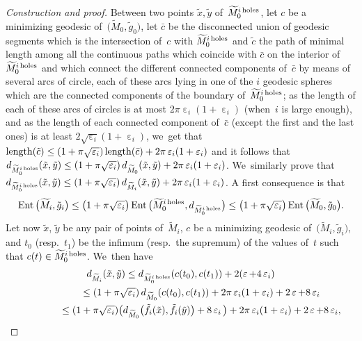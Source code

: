 \documentclass[pdftex]{sigma}
\numberwithin{equation}{section}
\newcommand{\Ent}{\operatorname{Ent}}
\newcommand{\e}{\operatorname{\varepsilon}}
\begin{document}
\begin{proof}[Construction and proof]
Between two points $\tilde x, \tilde y$ of~$\widetilde M_0^{i {\rm \, holes}}$, let $c$ be a minimizing geodesic of~$\big(\widetilde M_0, \tilde g_0\big)$, let $\bar c$ be
the disconnected union of geodesic segments which is the intersection of~$c$ with $\widetilde M_0^{i {\rm \, holes}}$ and $\tilde c$ the path of minimal length
among all the continuous paths which coincide with $\bar c$ on the interior of~$\widetilde M_0^{i {\rm \, holes}}$ and which connect the different
connected
components of~$\bar c$ by means of several arcs of circle, each of these arcs lying in one of the $i$ geodesic spheres which are the connected components of
the boundary of~$\widetilde M_0^{i {\rm \, holes}}$; as the length of each of these arcs of circles is at most $2 \pi \e_i (1 + \e_i)$ (when~$i$ is large enough),
and as the length of each connected component of~$\bar c$ (except the first and the last ones) is at least $2 \sqrt{\e_i} (1+\e_i)$, we~get that
${\rm length} (\tilde c) \le (1 + \pi \sqrt{\e_i})\, {\rm length} (\bar
c) + 2 \pi \e_i (1 + \e_i)$ and it follows that
$d_{\widetilde M_0^{i {\rm \, holes}}}(\tilde x,\tilde y) \le (1 + \pi \sqrt{\e_i})\, d_{\widetilde M_0 } (\tilde x, \tilde y) + 2 \pi \e_i (1 + \e_i)$. We~similarly prove that
$d_{\widetilde M_0^{i {\rm \, holes}}}(\tilde x,\tilde y) \le (1 + \pi \sqrt{\e_i})\, d_{\widetilde M_i } (\tilde x, \tilde y) + 2 \pi \e_i (1 + \e_i)$. A first consequence is that
\begin{gather*}
\Ent \big(\widetilde M_i, \tilde g_i\big) \le \big(1 + \pi \sqrt{\e_i}\big)
\Ent \big(\widetilde M_0^{i {\rm \, holes}}, d_{\widetilde M_0^{i {\rm \, holes}}}\big)
\le \big(1 + \pi \sqrt{\e_i}\big) \Ent \big(\widetilde M_0, \tilde g_0\big).
 \end{gather*}
Let now $\tilde x$, $\tilde y$ be any pair of points of~$\widetilde M_i$, $c$ be a minimizing geodesic of~$\big(\widetilde M_i, \tilde g_i\big)$, and $t_0$ (resp.~$t_1$) be the infimum (resp.\ the supremum) of the values of~$t$ such that $c(t) \in \widetilde M_0^{i {\rm \, holes}}$. We~then have
\begin{gather*}
d_{\widetilde M_i} (\tilde x, \tilde y) \le d_{\widetilde M_0^{i {\rm
\, holes}}} (c(t_0), c(t_1)) + 2 (\e + 4 \e_i)
\\ \hphantom{d_{\widetilde M_i} (\tilde x, \tilde y)}
{}\le (1 + \pi \sqrt{\e_i}) \, d_{\widetilde M_0}
( c(t_0), c(t_1)) + 2 \pi \e_i (1 + \e_i) + 2 \e + 8 \e_i
\\ \hphantom{d_{\widetilde M_i } (\tilde x, \tilde y)}
{}\le (1 + \pi \sqrt{\e_i}) \big(d_{\widetilde M_0 } \big(\tilde f_i (\tilde x), \tilde f_i (\tilde y) \big) + 8 \e_i \big) + 2 \pi \e_i (1 + \e_i) + 2 \e + 8 \e_i,

\end{gather*}
\end{proof}
\end{document}
